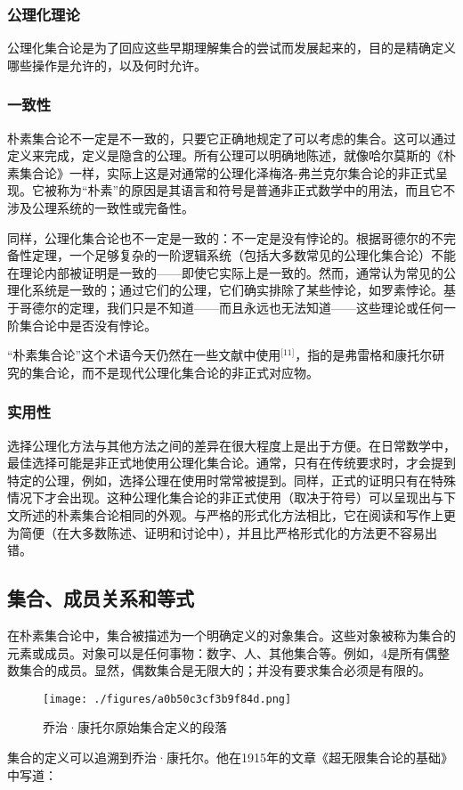 \subsubsection{公理化理论}  
公理化集合论是为了回应这些早期理解集合的尝试而发展起来的，目的是精确定义哪些操作是允许的，以及何时允许。
\subsubsection{一致性}  
朴素集合论不一定是不一致的，只要它正确地规定了可以考虑的集合。这可以通过定义来完成，定义是隐含的公理。所有公理可以明确地陈述，就像哈尔莫斯的《朴素集合论》一样，实际上这是对通常的公理化泽梅洛-弗兰克尔集合论的非正式呈现。它被称为“朴素”的原因是其语言和符号是普通非正式数学中的用法，而且它不涉及公理系统的一致性或完备性。

同样，公理化集合论也不一定是一致的：不一定是没有悖论的。根据哥德尔的不完备性定理，一个足够复杂的一阶逻辑系统（包括大多数常见的公理化集合论）不能在理论内部被证明是一致的——即使它实际上是一致的。然而，通常认为常见的公理化系统是一致的；通过它们的公理，它们确实排除了某些悖论，如罗素悖论。基于哥德尔的定理，我们只是不知道——而且永远也无法知道——这些理论或任何一阶集合论中是否没有悖论。

“朴素集合论”这个术语今天仍然在一些文献中使用\(^\text{[11]}\)，指的是弗雷格和康托尔研究的集合论，而不是现代公理化集合论的非正式对应物。
\subsubsection{实用性}  
选择公理化方法与其他方法之间的差异在很大程度上是出于方便。在日常数学中，最佳选择可能是非正式地使用公理化集合论。通常，只有在传统要求时，才会提到特定的公理，例如，选择公理在使用时常常被提到。同样，正式的证明只有在特殊情况下才会出现。这种公理化集合论的非正式使用（取决于符号）可以呈现出与下文所述的朴素集合论相同的外观。与严格的形式化方法相比，它在阅读和写作上更为简便（在大多数陈述、证明和讨论中），并且比严格形式化的方法更不容易出错。
\subsection{集合、成员关系和等式}
在朴素集合论中，集合被描述为一个明确定义的对象集合。这些对象被称为集合的元素或成员。对象可以是任何事物：数字、人、其他集合等。例如，4是所有偶整数集合的成员。显然，偶数集合是无限大的；并没有要求集合必须是有限的。
\begin{figure}[ht]
\centering
\texttt{[image: ./figures/a0b50c3cf3b9f84d.png]}
\caption{乔治·康托尔原始集合定义的段落} \label{fig_PSJHL_1}
\end{figure}
集合的定义可以追溯到乔治·康托尔。他在1915年的文章《超无限集合论的基础》中写道：

